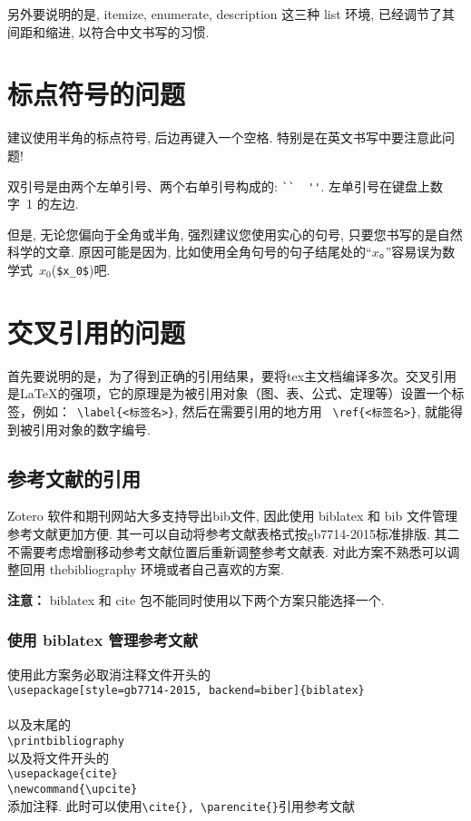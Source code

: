 另外要说明的是,  itemize, enumerate, description 这三种 list 环境, 已经调节了其间距和缩进,
以符合中文书写的习惯.

\section{标点符号的问题}

建议使用半角的标点符号, 后边再键入一个空格. 特别是在英文书写中要注意此问题!

双引号是由两个左单引号、两个右单引号构成的: \verb|``  ''|. 左单引号在键盘上数字~1 的左边.

但是, 无论您偏向于全角或半角, 强烈建议您使用实心的句号, 只要您书写的是自然科学的文章.
原因可能是因为, 比如使用全角句号的句子结尾处的``$x$。''容易误为数学式~$x_0$(\verb|$x_0$|)吧.

\section{交叉引用的问题}

首先要说明的是，为了得到正确的引用结果，要将tex主文档编译多次。交叉引用是\LaTeX 的强项，它的原理是为被引用对象（图、表、公式、定理等）设置一个标签，例如：~\verb|\label{<标签名>}|, 然后在需要引用的地方用 ~\verb|\ref{<标签名>}|, 就能得到被引用对象的数字编号.
\subsection{参考文献的引用}
Zotero 软件和期刊网站大多支持导出bib文件, 因此使用 biblatex 和 bib 文件管理参考文献更加方便. 其一可以自动将参考文献表格式按gb7714-2015标准排版. 其二不需要考虑增删移动参考文献位置后重新调整参考文献表. 对此方案不熟悉可以调整回用 {thebibliography} 环境或者自己喜欢的方案.

{\bfseries 注意：} biblatex 和 cite 包不能同时使用以下两个方案只能选择一个.

\subsubsection{使用 biblatex 管理参考文献}
使用此方案务必取消注释文件开头的\\
\verb|\usepackage[style=gb7714-2015, backend=biber]{biblatex}|\\
\verb||\\
以及末尾的\\
\verb|\printbibliography|\\
以及将文件开头的\\
\verb|\usepackage{cite}|\\
\verb|\newcommand{\upcite}|\\
添加注释. 此时可以使用\verb|\cite{}, \parencite{}|引用参考文献

